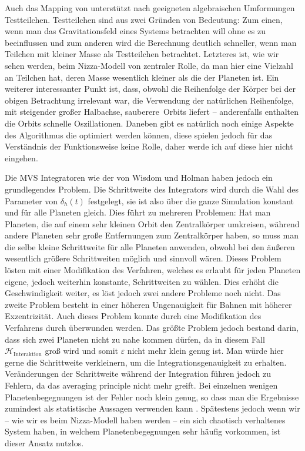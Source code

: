 \documentclass[12pt,a4paper,twoside,open=right,bibliography=totoc]{scrbook}
\renewcommand{\cite}{ \citep}
\renewcommand{\H}{\mathcal H}
\begin{document}
Auch das Mapping von \cite{Wisdom1991} unterstützt nach geeigneten algebraischen Umformungen Testteilchen.
Testteilchen sind aus zwei Gründen von Bedeutung: Zum einen, wenn man das Gravitationsfeld eines Systems betrachten will ohne es zu beeinflussen und zum anderen wird die Berechnung deutlich schneller, wenn man Teilchen mit kleiner Masse als Testteilchen betrachtet. Letzteres ist, wie wir sehen werden, beim Nizza-Modell von zentraler Rolle, da man hier eine Vielzahl an Teilchen hat, deren Masse wesentlich kleiner als die der Planeten ist.
Ein weiterer interessanter Punkt ist, dass, obwohl die Reihenfolge der Körper bei der obigen Betrachtung irrelevant war, die Verwendung der natürlichen Reihenfolge, mit steigender großer Halbachse, \glqq sauberere\grqq\ Orbits liefert -- anderenfalls enthalten die Orbits schnelle Oszillationen.
Daneben gibt es natürlich noch einige Aspekte des Algorithmus die optimiert werden können, diese spielen jedoch für das Verständnis der Funktionsweise keine Rolle, daher werde ich auf diese hier nicht eingehen.

Die MVS Integratoren wie der von Wisdom und Holman haben jedoch ein grundlegendes Problem. Die Schrittweite des Integrators wird durch die Wahl des Parameter von $\delta_{h}(t)$ festgelegt, sie ist also über die ganze Simulation konstant und für alle Planeten gleich.
Dies führt zu mehreren Problemen: Hat man Planeten, die auf einem sehr kleinen Orbit den Zentralkörper umkreisen, während andere Planeten sehr große Entfernungen zum Zentralkörper haben, so muss man die selbe kleine Schrittweite für alle Planeten anwenden, obwohl bei den äußeren wesentlich größere Schrittweiten möglich und sinnvoll wären. Dieses Problem lösten \cite{Saha1994} mit einer Modifikation des Verfahren, welches es erlaubt für jeden Planeten eigene, jedoch weiterhin konstante, Schrittweiten zu wählen.
Dies erhöht die Geschwindigkeit weiter, es löst jedoch zwei andere Probleme noch nicht. Das zweite Problem besteht in einer höheren Ungenauigkeit für Bahnen mit höherer Exzentrizität. Auch dieses Problem konnte durch eine Modifikation des Verfahrens durch \cite{Mikkola1997} überwunden werden.
Das größte Problem jedoch bestand darin, dass sich zwei Planeten nicht zu nahe kommen dürfen, da in diesem Fall $\H_{\mathrm{Interaktion}}$ groß wird und somit $\varepsilon$ nicht mehr klein genug ist. Man würde hier gerne die Schrittweite verkleinern, um die Integrationsgenauigkeit zu erhalten. Veränderungen der Schrittweite während der Integration führen jedoch zu Fehlern, da das averaging principle nicht mehr greift.
Bei einzelnen wenigen Planetenbegegnungen ist der Fehler noch klein genug, so dass man die Ergebnisse zumindest als statistische Aussagen verwenden kann\cite{Chambers1999}.
Spätestens jedoch wenn wir – wie wir es beim Nizza-Modell haben werden – ein sich chaotisch verhaltenes System haben, in welchem Planetenbegegnungen sehr häufig vorkommen, ist dieser Ansatz nutzlos.
\end{document}
